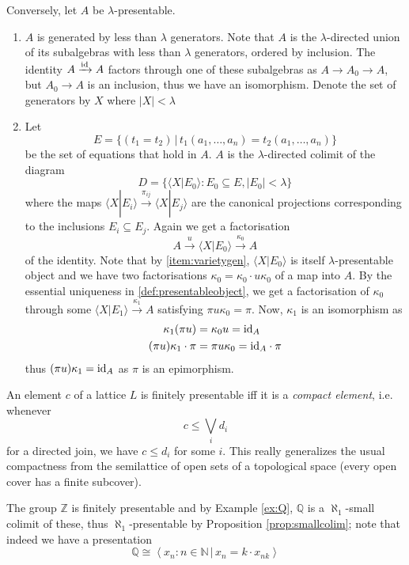 Conversely, let $A$ be $\lambda$-presentable.
\begin{enumerate}
\item \label{item:varietygen} $A$ is generated by less than $\lambda$ generators. Note that $A$ is the $\lambda$-directed union of its subalgebras with less than $\lambda$ generators, ordered by inclusion. The identity $A \xrightarrow{\textrm{id}} A$ factors through one of these subalgebras as $A \to A_0 \to A$, but $A_0 \to A$ is an inclusion, thus we have an isomorphism. Denote the set of generators by $X$ where $|X| < \lambda$
\item Let \[ E = \{ (t_1 = t_2) \,|\, t_1(a_1,\ldots,a_n) = t_2(a_1, \ldots, a_n) \} \] be the set of equations that hold in $A$. $A$ is the $\lambda$-directed colimit of the diagram
\[ D = \{ \langle X|E_0\rangle : E_0 \subseteq E, |E_0| < \lambda \} \]
where the maps $\langle X|E_i\rangle \xrightarrow{\pi_{ij}} \langle X|E_j\rangle$ are the canonical projections corresponding to the inclusions $E_i \subseteq E_j$. Again we get a factorisation 
\[ A \xrightarrow{u} \langle X|E_0 \rangle \xrightarrow{\kappa_0} A \]
of the identity. Note that by \ref{item:varietygen}, $\langle X|E_0 \rangle$ is itself $\lambda$-presentable object and we have two factorisations $\kappa_0 = \kappa_0 \cdot u\kappa_0$ of a map into $A$. By the essential uniqueness in \ref{def:presentableobject}, we get a factorisation of $\kappa_0$ through some $\langle X|E_1 \rangle \xrightarrow{\kappa_1} A$ satisfying $\pi u \kappa_0 = \pi$. Now, $\kappa_1$ is an isomorphism as
\begin{align*}
\kappa_1 (\pi u) &= \kappa_0 u = \textrm{id}_A \\
(\pi u) \kappa_1 \cdot \pi &= \pi u \kappa_0 = \textrm{id}_A \cdot \pi
\end{align*}
thus $(\pi u) \kappa_1 = \textrm{id}_A$ as $\pi$ is an epimorphism.

\end{enumerate}

\begin{Example}
An element $c$ of a lattice $L$ is finitely presentable iff it is a \emph{compact element}, i.e. whenever
\[ c \leq \bigvee_i d_i \]
for a directed join, we have $c \leq d_i$ for some $i$. This really generalizes the usual compactness from the semilattice of open sets of a topological space (every open cover has a finite subcover).
\end{Example}
\begin{Example}
The group $\mathbb Z$ is finitely presentable and by Example \ref{ex:Q}, $\mathbb Q$ is a $\aleph_1$-small colimit of these, thus $\aleph_1$-presentable by Proposition \ref{prop:smallcolim}; note that indeed we have a presentation
\[ \mathbb Q \cong \left\langle x_n : n \in \mathbb N\,|\,x_n = k \cdot x_{nk} \right \rangle\]
\end{Example}

